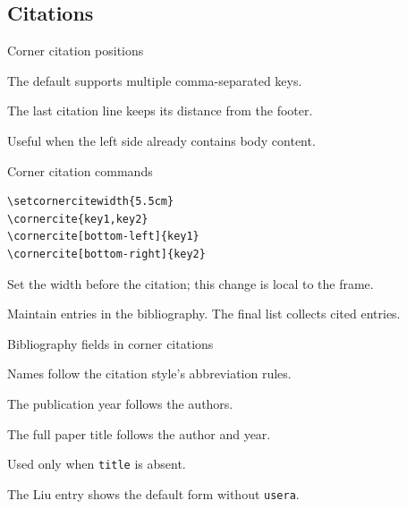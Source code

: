 \subsection{Citations}
\begin{frame}{Corner citation positions}
  \setcornercitewidth{5.5cm}
  \begin{description}
    \item[Top right] The default supports multiple comma-separated keys.
    \item[Bottom left] The last citation line keeps its distance from the footer.
    \item[Bottom right] Useful when the left side already contains body content.
  \end{description}
\end{frame}

\begin{frame}[fragile]{Corner citation commands}
  \begin{verbatim}
\setcornercitewidth{5.5cm}
\cornercite{key1,key2}
\cornercite[bottom-left]{key1}
\cornercite[bottom-right]{key2}
  \end{verbatim}
  \begin{description}[Width]
    \item[Width] Set the width before the citation; this change is local to the frame.
    \item[Data] Maintain entries in the bibliography. The final list collects cited entries.
  \end{description}
\end{frame}

\begin{frame}{Bibliography fields in corner citations}
  \begin{description}
    \item[\texttt{author}] Names follow the citation style's abbreviation rules.
    \item[\texttt{year}] The publication year follows the authors.
    \item[\texttt{title}] The full paper title follows the author and year.
    \item[\texttt{shorttitle}] Used only when \texttt{title} is absent.
  \end{description}
  \medskip
  The Liu entry shows the default form without \texttt{usera}.
\end{frame}

